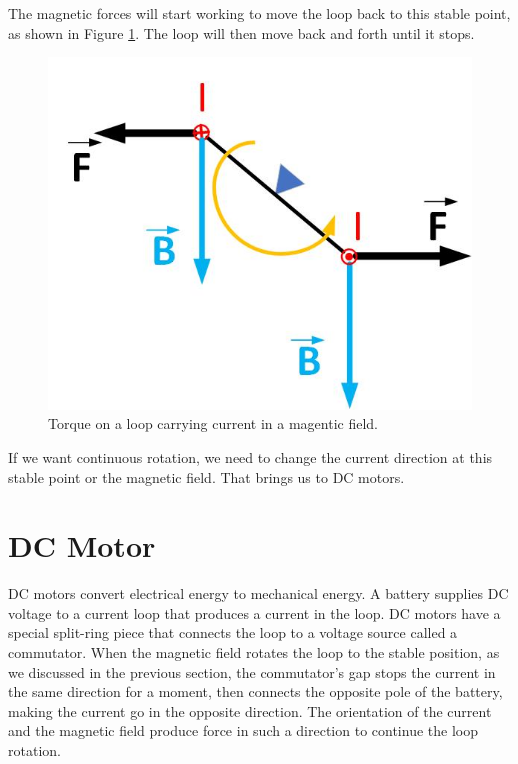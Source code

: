 \documentclass{ximera}
\begin{document}
The magnetic forces will start working to move the loop back to this stable point, as shown in Figure \ref{fig:currentLoopTorque3}. The loop will then move back and forth until it stops.

\begin{figure}[htbp]
\begin{center}
\includegraphics[scale=0.5]{../jpg/conceptMagMom3.jpg}
\end{center}
\caption{Torque on a loop carrying current in a magentic field. }
\label{fig:currentLoopTorque3}
\end{figure}



If we want continuous rotation, we need to change the current direction at this stable point or the magnetic field. That brings us to DC motors.


\section{DC Motor}


DC motors convert electrical energy to mechanical energy. A battery supplies DC voltage to a current loop that produces a current in the loop. 
DC motors have a special split-ring piece that connects the loop to a voltage source called a commutator. When the magnetic field rotates the loop to the stable position, as we discussed in the previous section, the commutator's gap stops the current in the same direction for a moment, then connects the opposite pole of the battery, making the current go in the opposite direction. The orientation of the current and the magnetic field produce force in such a direction to continue the loop rotation.
\end{document}
